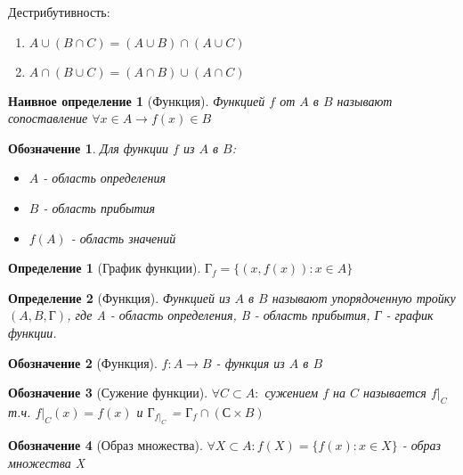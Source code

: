 \documentclass[11pt,a4paper,titlepage]{article}
\newtheorem*{definition}{Определение}
\newtheorem*{n_definition}{Наивное определение}
\newtheorem*{notation}{Обозначение}
\begin{document}
    \bigskip

    Дестрибутивность:
    \begin{enumerate}
        \item \(A \cup (B \cap C) = (A \cup B) \cap (A \cup C) \)
        \item \(A \cap (B \cup C) = (A \cap B) \cup (A \cap C) \)
    \end{enumerate}

    \begin{n_definition}[Функция]
        Функцией $f$ от $A$ в $B$ называют сопоставление $\forall x \in A \to f(x) \in B$
    \end{n_definition}

    \begin{notation}
        Для функции $f$ из $A$ в $B$:
        \begin{itemize}
            \item $A$ - область определения
            \item $B$ - область прибытия
            \item $f(A)$ - область значений
        \end{itemize}
    \end{notation}

    \begin{definition}[График функции]
        $Г_f = \{(x, f(x)) : x \in A\}$
    \end{definition}

    \begin{definition}[Функция]
        Функцией из $A$ в $B$ называют упорядоченную тройку $(A, B, Г)$, где A - область определения, B - область прибытия, Г - график функции.
    \end{definition}

    \begin{notation}[Функция]
        $f: A \to B$ - функция из $A$ в $B$
    \end{notation}

    \begin{notation}[Сужение функции]
        $\forall C \subset A:$ сужением $f$ на $C$ называется $f|_C$ т.ч.  $f|_C(x) = f(x)$  и $Г_{f|_C}$ = $Г_f \cap (С \times B) $
    \end{notation}

    \begin{notation}[Образ множества]
        $\forall X \subset A: f(X) = \{f(x) : x \in X\}$ - образ множества X
    \end{notation}
\end{document}
